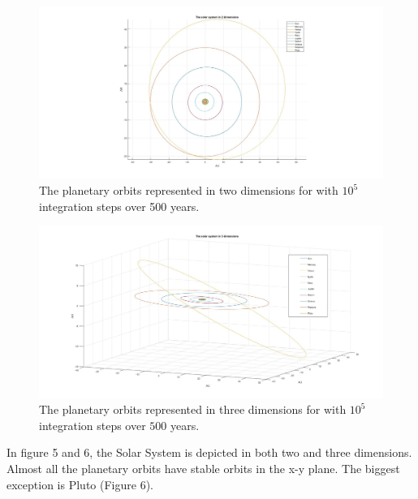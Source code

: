 \documentclass[10pt,a4paper]{article}
\begin{document}
\begin{figure} [H]  
\centerline{\includegraphics[scale=0.40]{2dsolsys.jpg}}
\caption{The planetary orbits represented in two dimensions for with $10^5$ integration steps over 500 years.}
\end{figure}



\begin{figure} [H]

\centerline{\includegraphics[scale=0.35]{3dsolsys.jpg}}
\caption{The planetary orbits represented in three dimensions for with $10^5$ integration steps over $500$ years.}

\end{figure}


\noindent In figure 5 and 6, the Solar System is depicted in both two and three dimensions. Almost all the planetary orbits have stable orbits in the x-y plane. The biggest exception is Pluto (Figure 6). 
\end{document}

